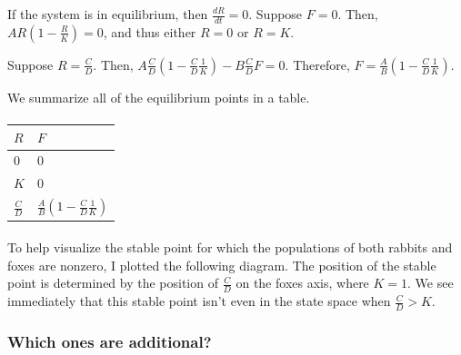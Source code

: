 \documentclass{article}
\begin{document}
If the system is in equilibrium, then $\frac{dR}{dt} = 0$.
Suppose $F = 0$.
Then, $A R \left( 1 - \frac{R}{K} \right) = 0$, and thus
	either $R = 0$ or $R = K$.

Suppose $R = \frac{C}{D}$.
Then, $A \frac{C}{D} \left( 1 - \frac{C}{D} \frac{1}{K} \right) 
	- B \frac{C}{D} F = 0$.
Therefore, $F = \frac{A}{B} \left( 1 - \frac{C}{D} \frac{1}{K} \right)$.

We summarize all of the equilibrium points in a table.

\paragraph{}
\begin{tabular}{|l|l|}
\hline
$R$ & $F$ \\
\hline
$0$ & $0$ \\
\hline
$K$ & $0$ \\
\hline
$\frac{C}{D}$ & $\frac{A}{B} \left( 1 - \frac{C}{D} \frac{1}{K} \right)$ \\
\hline
\end{tabular}

\paragraph{}
To help visualize the stable point for which the populations 
	of both rabbits and foxes are nonzero, I plotted the following
	diagram.
The position of the stable point is determined by the position
	of $\frac{C}{D}$ on the foxes axis, where $K = 1$.
We see immediately that this stable point isn't even in the 
	state space when $\frac{C}{D} > K$.


\paragraph{}


\subsubsection{Which ones are additional?}
\end{document}
